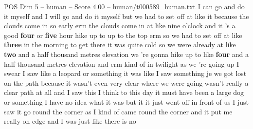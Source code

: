 \begin{textsample}{POS Dim 5 – human – Score 4.00 – human/t000589\_human.txt}  \label{ex:f5_pos_017}
I can go and do it myself and I will go and do it myself but we had to set off at like it because the clouds come in so early erm the clouds come in at like nine o'clock and it 's a good \textbf{four} or \textbf{five} hour hike up to up to the top erm so we had to set off at like \textbf{three} in the morning to get there it was quite cold so we were already at like \textbf{two} and a half thousand metres elevation we 're gonna hike up to like \textbf{four} and a half thousand metres elevation and erm kind of in twilight as we 're going up I swear I saw like a leopard or something it was like I saw something je we got lost on the path because it wasn't even very clear where we were going wasn't really a clear path at all and I saw this I think to this day it must have been a large dog or something I have no idea what it was but it it just went off in front of us I just saw it go round the corner as I kind of came round the corner and it put me really on edge and I was just like there is no

\end{textsample}
